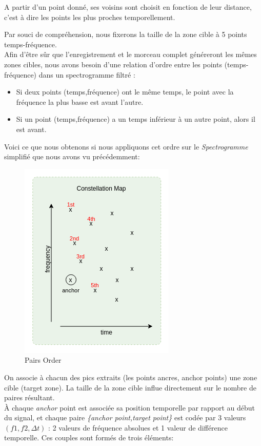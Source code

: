 \documentclass[11pt, report, french]{scrreprt}
\begin{document}
A partir d'un point donné, ses voisins sont choisit en fonction de leur distance, c'est à dire les points les plus proches temporellement.   

Par souci de compréhension, nous fixerons la taille de la zone cible à 5 points temps-fréquence.\\
Afin d'être sûr que l'enregistrement et le morceau complet généreront les mêmes zones cibles, nous avons besoin d'une relation d'ordre entre les points (temps-fréquence) dans un spectrogramme filtré :\\

\begin{itemize}
	\item Si deux points (temps,fréquence) ont le même temps, le point avec la fréquence la plus basse est avant l'autre.
	\item Si un point (temps,fréquence) a un temps inférieur à un autre point, alors il est avant.
\end{itemize} 

\vspace{0.5cm}
Voici ce que nous obtenons si nous appliquons cet ordre sur le \textit{Spectrogramme} simplifié que nous avons vu précédemment:

\begin{figure}[H]
	\centering
	\includegraphics[scale=0.62]{img/pairs2.png}
	\caption{Pairs Order}
\end{figure}

\vspace{0.5cm}
On associe à chacun des pics extraits (les points ancres, anchor points) une zone cible (target zone). La taille de la zone cible influe directement sur le nombre de paires résultant.\\
À chaque \textit{anchor} point est associée sa position temporelle par rapport au début du signal, et chaque paire \textit{ \{anchor point,target point\}} est codée par 3 valeurs $(f1, f2, \Delta t)$ : 2 valeurs de fréquence absolues et 1 valeur de diﬀérence temporelle. Ces couples sont formés de trois éléments:\\
\end{document}
